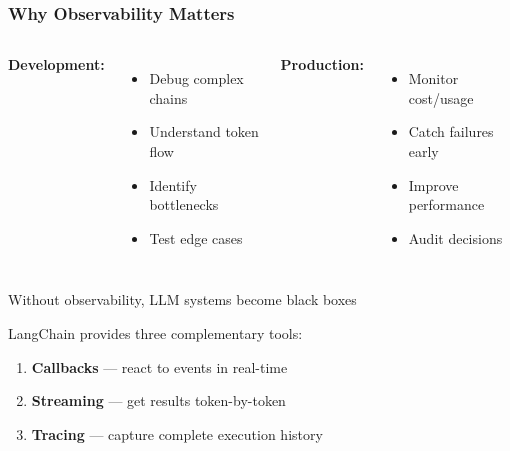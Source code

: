 \documentclass[aspectratio=169,11pt]{beamer}
\begin{document}

\begin{frame}
  \frametitle{Why Observability Matters}

  \begin{columns}[T]
    \textbf{Development:}
    \begin{itemize}
    \setlength{\itemsep}{1pt}
      \item Debug complex chains
      \item Understand token flow
      \item Identify bottlenecks
      \item Test edge cases
    \end{itemize}

    \textbf{Production:}
    \begin{itemize}
    \setlength{\itemsep}{1pt}
      \item Monitor cost/usage
      \item Catch failures early
      \item Improve performance
      \item Audit decisions
    \end{itemize}
  \end{columns}

  \vspace{0.2cm}

  \begin{center}
    \begin{tcolorbox}[colback=lcblue!10, colframe=lcblue, title=Key Insight]
      Without observability, LLM systems become black boxes
    \end{tcolorbox}
  \end{center}

  \vspace{0.15cm}

  LangChain provides three complementary tools:
  \begin{enumerate}
    \setlength{\itemsep}{1pt}
    \item \textbf{Callbacks} — react to events in real-time
    \item \textbf{Streaming} — get results token-by-token
    \item \textbf{Tracing} — capture complete execution history
  \end{enumerate}
\end{frame}
\end{document}
